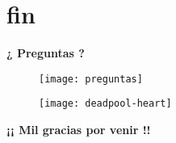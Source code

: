 \section*{fin}
\begin{frame}
 \begin{center}
  \LARGE \textbf{¿ Preguntas ?}
  \begin{figure}[H]
    \texttt{[image: preguntas]}
 \end{figure}
 \end{center}
\end{frame}
\begin{frame}
 \begin{center}
  \begin{figure}[H]
    \texttt{[image: deadpool-heart]}
  \end{figure}
  \LARGE \textbf{¡¡ Mil gracias por venir !!}
 \end{center}
\end{frame}